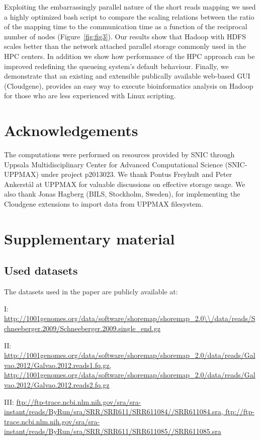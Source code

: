 \documentclass[11pt, oneside]{article}   	%
\begin{document}
Exploiting the embarrassingly parallel nature of the short reads mapping we used a highly optimized bash script to compare the scaling relations between the ratio of the mapping time to the communication time as a function of the reciprocal number of nodes (Figure~\ref{fig:fig3}). 
Our results show that Hadoop with HDFS scales better than the network attached parallel storage commonly used in the HPC centers.
In addition we show how performance of the HPC approach can be improved redefining the queueing system's default behaviour. Finally, we demonstrate that an existing and extensible publically available web-based GUI (Cloudgene), provides an easy way to execute bioinformatics analysis on Hadoop for those who are less experienced with Linux scripting.



\section{Acknowledgements}
The computations were performed on resources provided by SNIC through Uppsala Multidisciplinary Center for Advanced Computational Science (SNIC-UPPMAX) under project p2013023.
We thank Pontus Freyhult and Peter Ankerst{\aa}l at UPPMAX for valuable discussions on effective storage usage. We also thank Jonas Hagberg (BILS, Stockholm, Sweden), for implementing the Cloudgene extensions to import data from UPPMAX filesystem.



\section{Supplementary material}

\subsection{Used datasets}

The datasets used in the paper are publicly available at:

I: \url{http://1001genomes.org/data/software/shoremap/shoremap\_2.0\\/data/reads/Schneeberger.2009/Schneeberger.2009.single\_end.gz}

II: \url{http://1001genomes.org/data/software/shoremap/shoremap\_2.0/data/reads/Galvao.2012/Galvao.2012.reads1.fq.gz, http://1001genomes.org/data/software/shoremap/shoremap\_2.0/data/reads/Galvao.2012/Galvao.2012.reads2.fq.gz}	

III: \url{ftp://ftp-trace.ncbi.nlm.nih.gov/sra/sra-instant/reads/ByRun/sra/SRR/SRR611/SRR611084//SRR611084.sra, ftp://ftp-trace.ncbi.nlm.nih.gov/sra/sra-instant/reads/ByRun/sra/SRR/SRR611/SRR611085//SRR611085.sra}
\end{document}

